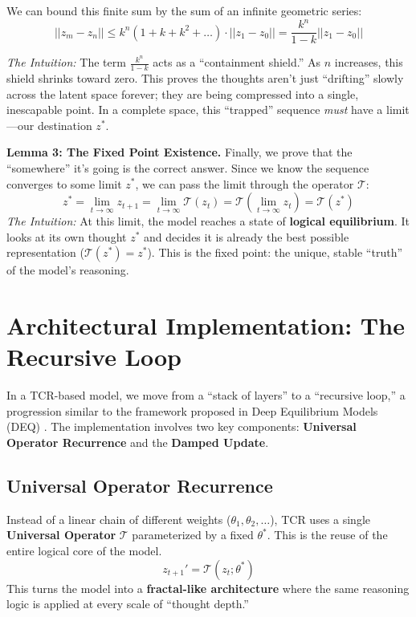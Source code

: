 \documentclass[11pt, a4paper]{article}
\begin{document}
We can bound this finite sum by the sum of an infinite geometric series:
\begin{equation}
 ||z_m - z_n|| \le k^n(1 + k + k^2 + \dots) \cdot ||z_1 - z_0|| = \frac{k^n}{1-k} ||z_1 - z_0|| 
\end{equation}

\textit{The Intuition:} The term $\frac{k^n}{1-k}$ acts as a ``containment shield.'' As $n$ increases, this shield shrinks toward zero. This proves the thoughts aren't just ``drifting'' slowly across the latent space forever; they are being compressed into a single, inescapable point. In a complete space, this ``trapped'' sequence \textit{must} have a limit---our destination $z^*$.

\textbf{Lemma 3: The Fixed Point Existence.}
Finally, we prove that the ``somewhere'' it's going is the correct answer. Since we know the sequence converges to some limit $z^*$, we can pass the limit through the operator $\mathcal{T}$:
\begin{equation}
 z^* = \lim_{t \to \infty} z_{t+1} = \lim_{t \to \infty} \mathcal{T}(z_t) = \mathcal{T}(\lim_{t \to \infty} z_t) = \mathcal{T}(z^*) 
\end{equation}
\textit{The Intuition:} At this limit, the model reaches a state of \textbf{logical equilibrium}. It looks at its own thought $z^*$ and decides it is already the best possible representation ($\mathcal{T}(z^*) = z^*$). This is the fixed point: the unique, stable ``truth'' of the model's reasoning.

\section{Architectural Implementation: The Recursive Loop}

In a TCR-based model, we move from a ``stack of layers'' to a ``recursive loop,'' a progression similar to the framework proposed in Deep Equilibrium Models (DEQ) \cite{bai2019deep}. The implementation involves two key components: \textbf{Universal Operator Recurrence} and the \textbf{Damped Update}.

\subsection{Universal Operator Recurrence}
Instead of a linear chain of different weights ($\theta_1, \theta_2, \dots$), TCR uses a single \textbf{Universal Operator} $\mathcal{T}$ parameterized by a fixed $\theta^*$. This is the reuse of the entire logical core of the model.
\begin{equation}
 z_{t+1}' = \mathcal{T}(z_t; \theta^*) 
\end{equation}
This turns the model into a \textbf{fractal-like architecture} where the same reasoning logic is applied at every scale of ``thought depth.''
\end{document}
